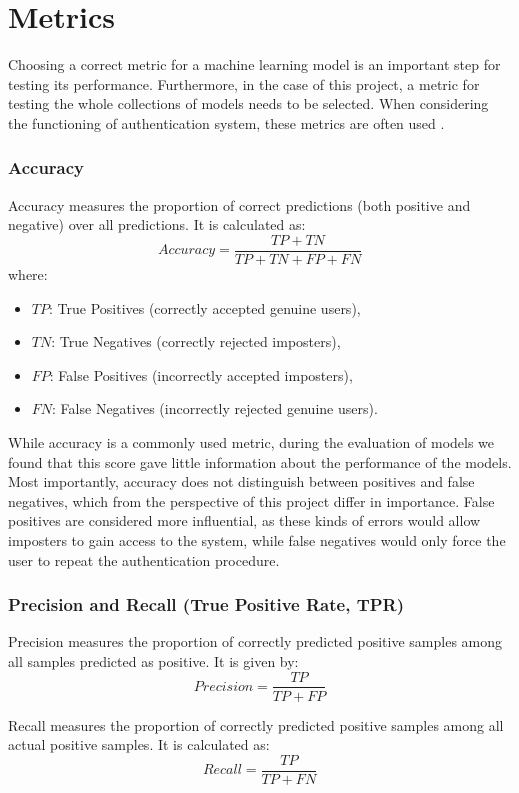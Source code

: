 \section{Metrics}
Choosing a correct metric for a machine learning model is an important step for testing its performance. Furthermore, in the case of this project, a metric for testing the whole collections of models needs to be selected.
When considering the functioning of authentication system, these metrics are often used \cite{traore2011continuous}. 

\subsubsection{Accuracy}
Accuracy measures the proportion of correct predictions (both positive and negative) over all predictions. It is calculated as:
\[
Accuracy = \frac{TP + TN}{TP + TN + FP + FN}
\]
where:
\begin{itemize}
	\item $TP$: True Positives (correctly accepted genuine users),
	\item $TN$: True Negatives (correctly rejected imposters),
	\item $FP$: False Positives (incorrectly accepted imposters),
	\item $FN$: False Negatives (incorrectly rejected genuine users).
\end{itemize}

While accuracy is a commonly used metric, during the evaluation of models we found that this score gave little information about the performance of the models. Most importantly, accuracy does not distinguish between positives and false negatives, which from the perspective of this project differ in importance. False positives are considered more influential, as these kinds of errors would allow imposters to gain access to the system, while false negatives would only force the user to repeat the authentication procedure.

\subsubsection{Precision and Recall (True Positive Rate, TPR)}
Precision measures the proportion of correctly predicted positive samples among all samples predicted as positive. It is given by:
\[
Precision = \frac{TP}{TP + FP}
\]

Recall measures the proportion of correctly predicted positive samples among all actual positive samples. It is calculated as:
\[
Recall = \frac{TP}{TP + FN}
\]

